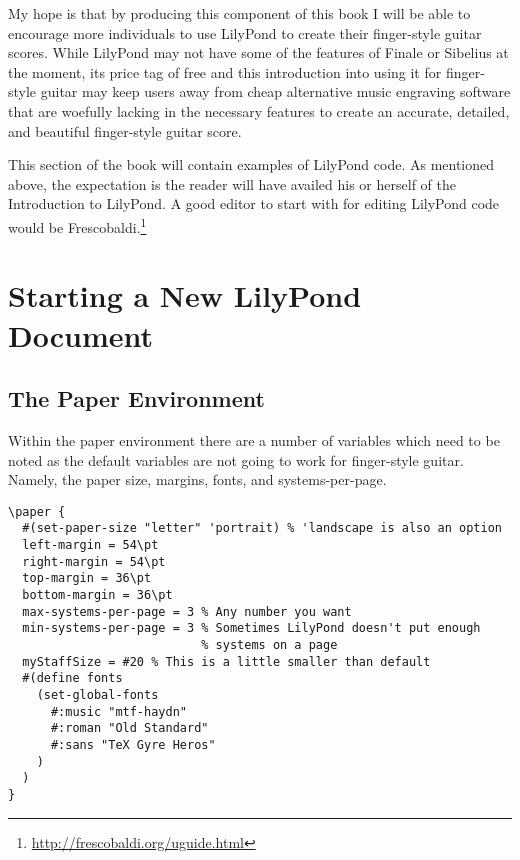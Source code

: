 \documentclass[]{memoir}
\begin{document}
My hope is that by producing this component of this book I will be
able to encourage more individuals to use LilyPond to create their
finger-style guitar scores. While LilyPond may not have some of the
features of Finale or Sibelius at the moment, its price tag of free
and this introduction into using it for finger-style guitar may keep
users away from cheap alternative music engraving software that are
woefully lacking in the necessary features to create an accurate,
detailed, and beautiful finger-style guitar score.

This section of the book will contain examples of LilyPond code. As
mentioned above, the expectation is the reader will have availed his
or herself of the Introduction to LilyPond. A good editor to start
with for editing LilyPond code would be
Frescobaldi.\footnote{\url{http://frescobaldi.org/uguide.html}}

\chapter{Starting a New LilyPond Document}
\label{cha:start-new-lilyp}

\section{The Paper Environment}
\label{sec:paper-environment}

Within the paper environment there are a number of variables which
need to be noted as the default variables are not going to work for
finger-style guitar. Namely, the paper size, margins, fonts, and
systems-per-page.
\begin{verbatim}
\paper {
  #(set-paper-size "letter" 'portrait) % 'landscape is also an option
  left-margin = 54\pt 
  right-margin = 54\pt
  top-margin = 36\pt
  bottom-margin = 36\pt
  max-systems-per-page = 3 % Any number you want
  min-systems-per-page = 3 % Sometimes LilyPond doesn't put enough 
                           % systems on a page
  myStaffSize = #20 % This is a little smaller than default
  #(define fonts
    (set-global-fonts
      #:music "mtf-haydn"
      #:roman "Old Standard"
      #:sans "TeX Gyre Heros"
    )
  )
}
\end{verbatim}

\backmatter
\printindex
\end{document}
